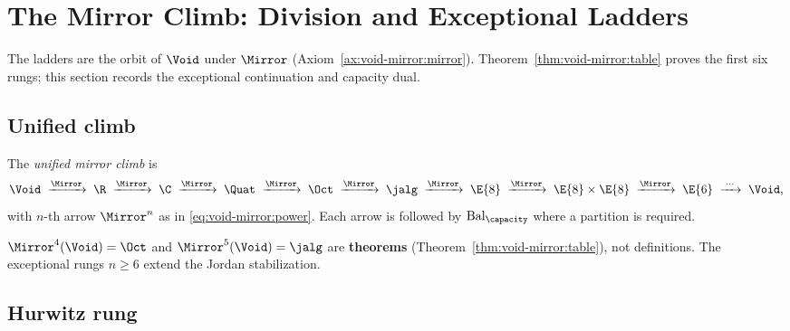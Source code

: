 \section{The Mirror Climb: Division and Exceptional Ladders}
\label{sec:ladder}

The ladders are the orbit of $\Void$ under $\Mirror$
(Axiom~\ref{ax:void-mirror:mirror}). Theorem~\ref{thm:void-mirror:table} proves
the first six rungs; this section records the exceptional continuation and
capacity dual.

\subsection{Unified climb}
\label{sec:ladder:unified}

\begin{definition}\label{def:ladder:unified}
The \emph{unified mirror climb} is
\begin{equation}\label{eq:ladder:unified}
  \Void
  \;\xrightarrow{\Mirror}\;
  \R\;\xrightarrow{\Mirror}\;\C\;\xrightarrow{\Mirror}\;\Quat
  \;\xrightarrow{\Mirror}\;\Oct\;\xrightarrow{\Mirror}\;\jalg
  \;\xrightarrow{\Mirror}\;\E{8}\;\xrightarrow{\Mirror}\;\E{8}\times\E{8}
  \;\xrightarrow{\Mirror}\;\E{6}\;\xrightarrow{\;\cdots\;}\;\Void,
\end{equation}
with $n$-th arrow $\Mirror^n$ as in \eqref{eq:void-mirror:power}. Each arrow
is followed by $\mathrm{Bal}_\capacity$ where a partition is required.
\end{definition}

\begin{remark}
$\Mirror^4(\Void)=\Oct$ and $\Mirror^5(\Void)=\jalg$ are \textbf{theorems}
(Theorem~\ref{thm:void-mirror:table}), not definitions. The exceptional rungs
$n\geq6$ extend the Jordan stabilization.
\end{remark}

\subsection{Hurwitz rung}
\label{sec:ladder:hurwitz}

